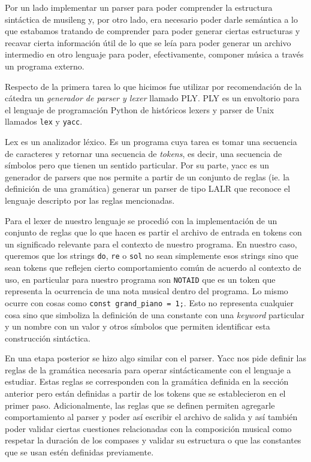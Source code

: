 Por un lado implementar un parser para poder comprender la estructura sintáctica de musileng y, por otro lado, 
era necesario poder darle semántica a lo que estabamos tratando de comprender para poder generar ciertas estructuras y recavar 
cierta información útil de lo que se leía para poder generar un archivo intermedio en otro lenguaje para poder, efectivamente,
componer música a través un programa externo.

Respecto de la primera tarea lo que hicimos fue utilizar por recomendación de la cátedra un \emph{generador de parser y lexer} llamado
PLY. PLY es un envoltorio para el lenguaje de programación Python de históricos lexers y parser de Unix llamados \texttt{lex} y \texttt{yacc}.

Lex es un analizador léxico. Es un programa cuya tarea es tomar una secuencia de caracteres y retornar una secuencia de \emph{tokens}, es decir,
una secuencia de símbolos pero que tienen un sentido particular. Por su parte, yacc es un generador de parsers que nos permite a partir de un
conjunto de reglas (ie. la definición de una gramática) generar un parser de tipo LALR que reconoce el lenguaje descripto por las reglas mencionadas.

Para el lexer de nuestro lenguaje se procedió con la implementación de un conjunto de reglas que lo que hacen es partir el archivo de entrada
en tokens con un significado relevante para el contexto de nuestro programa. En nuestro caso, queremos que los strings \texttt{do}, \texttt{re} o
\texttt{sol} no sean simplemente esos strings sino que sean tokens que reflejen cierto comportamiento común de acuerdo al contexto de uso, en particular
para nuestro programa son \texttt{NOTAID} que es un token que representa la ocurrencia de una nota musical dentro del programa. Lo mismo ocurre
con cosas como \texttt{const grand\_piano = 1;}. Esto no representa cualquier cosa sino que simboliza la definición de una constante con una
\emph{keyword} particular y un nombre con un valor y otros símbolos que permiten identificar esta construcción sintáctica.

En una etapa posterior se hizo algo similar con el parser. Yacc nos pide definir las reglas de la gramática necesaria para operar
sintácticamente con el lenguaje a estudiar. Estas reglas se corresponden con la gramática definida en la sección anterior pero están
definidas a partir de los tokens que se establecieron en el primer paso. Adicionalmente, las reglas que se definen permiten agregarle comportamiento 
al parser y poder así escribir el archivo de salida y así también poder validar ciertas cuestiones relacionadas con la composición musical
como respetar la duración de los compases y validar su estructura o que las constantes que se usan estén definidas previamente.

